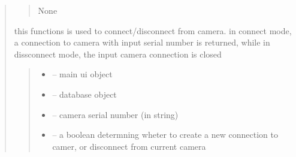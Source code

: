 \documentclass[letterpaper,10pt,english]{sphinxmanual}
\begin{document}
\begin{quote}
\begin{savenotes}
\begin{fulllineitems}
\begin{quote}
\begin{description}
\begin{itemize}
\end{itemize}

\sphinxAtStartPar
None

\end{description}\end{quote}

\end{fulllineitems}\end{savenotes}


\begin{savenotes}\begin{fulllineitems}
\label{\detokenize{setting/backend/camera_funcs:oxin.backend.camera_funcs.connect_disconnect_camera}}
\pysigstartsignatures
{}
\pysigstopsignatures
\sphinxAtStartPar
this functions is used to connect/disconnect from camera.
in connect mode, a connection to camera with input serial number is returned,
while in dissconnect mode, the input camera connection is closed
\begin{quote}\begin{description}
\begin{itemize}
\item {} 
\sphinxAtStartPar
{} – main ui object

\item {} 
\sphinxAtStartPar
{} – database object

\item {} 
\sphinxAtStartPar
{} – camera serial number (in string)

\item {} 
\sphinxAtStartPar
{} – a boolean determning wheter to create a new connection to camer, or disconnect from current camera


\end{itemize}
\end{description}
\end{quote}
\end{fulllineitems}
\end{savenotes}
\end{quote}
\end{document}
